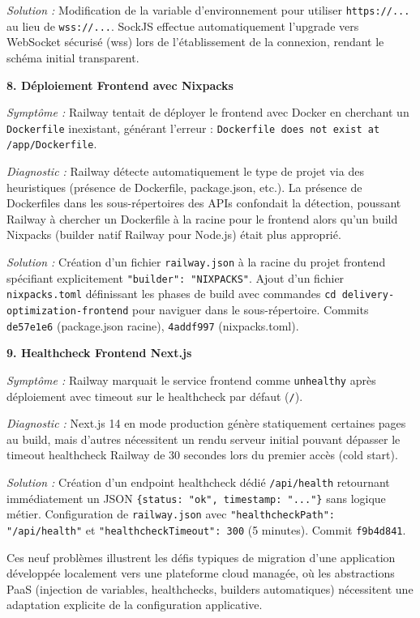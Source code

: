 \textit{Solution :} Modification de la variable d'environnement pour utiliser \texttt{https://...} au lieu de \texttt{wss://...}. SockJS effectue automatiquement l'upgrade vers WebSocket sécurisé (wss) lors de l'établissement de la connexion, rendant le schéma initial transparent.

\textbf{8. Déploiement Frontend avec Nixpacks}

\textit{Symptôme :} Railway tentait de déployer le frontend avec Docker en cherchant un \texttt{Dockerfile} inexistant, générant l'erreur : \texttt{Dockerfile does not exist at /app/Dockerfile}.

\textit{Diagnostic :} Railway détecte automatiquement le type de projet via des heuristiques (présence de Dockerfile, package.json, etc.). La présence de Dockerfiles dans les sous-répertoires des APIs confondait la détection, poussant Railway à chercher un Dockerfile à la racine pour le frontend alors qu'un build Nixpacks (builder natif Railway pour Node.js) était plus approprié.

\textit{Solution :} Création d'un fichier \texttt{railway.json} à la racine du projet frontend spécifiant explicitement \texttt{"builder": "NIXPACKS"}. Ajout d'un fichier \texttt{nixpacks.toml} définissant les phases de build avec commandes \texttt{cd delivery-optimization-frontend} pour naviguer dans le sous-répertoire. Commits \texttt{de57e1e6} (package.json racine), \texttt{4addf997} (nixpacks.toml).

\textbf{9. Healthcheck Frontend Next.js}

\textit{Symptôme :} Railway marquait le service frontend comme \texttt{unhealthy} après déploiement avec timeout sur le healthcheck par défaut (\texttt{/}).

\textit{Diagnostic :} Next.js 14 en mode production génère statiquement certaines pages au build, mais d'autres nécessitent un rendu serveur initial pouvant dépasser le timeout healthcheck Railway de 30 secondes lors du premier accès (cold start).

\textit{Solution :} Création d'un endpoint healthcheck dédié \texttt{/api/health} retournant immédiatement un JSON \texttt{\{status: "ok", timestamp: "..."\}} sans logique métier. Configuration de \texttt{railway.json} avec \texttt{"healthcheckPath": "/api/health"} et \texttt{"healthcheckTimeout": 300} (5 minutes). Commit \texttt{f9b4d841}.

Ces neuf problèmes illustrent les défis typiques de migration d'une application développée localement vers une plateforme cloud managée, où les abstractions PaaS (injection de variables, healthchecks, builders automatiques) nécessitent une adaptation explicite de la configuration applicative.

